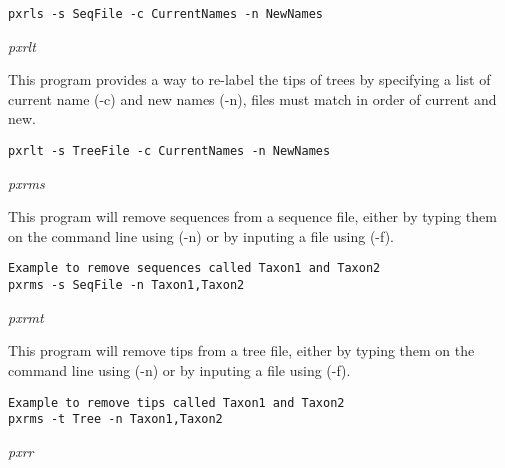 \documentclass[12pt,letterpaper]{article}
\renewcommand{\subsection}[1]{%
\bigskip
\begin{center}
\begin{large}
\normalfont\itshape #1
\end{large}
\end{center}}
\begin{document}
\begin{flushleft}
\begin{verbatim}
pxrls -s SeqFile -c CurrentNames -n NewNames
\end{verbatim}
\end{flushleft}


\subsection{pxrlt}

This program provides a way to re-label the tips of trees by specifying a list of current name (-c) and new names (-n), files must match in order of current and new.

\begin{flushleft}
\begin{verbatim}
pxrlt -s TreeFile -c CurrentNames -n NewNames
\end{verbatim}
\end{flushleft}

\subsection{pxrms}

This program will remove sequences from a sequence file, either by typing them on the command line using (-n) or by inputing a file using (-f).

\begin{flushleft}
\begin{verbatim}
Example to remove sequences called Taxon1 and Taxon2
pxrms -s SeqFile -n Taxon1,Taxon2
\end{verbatim}
\end{flushleft}

\subsection{pxrmt}

This program will remove tips from a tree file, either by typing them on the command line using (-n) or by inputing a file using (-f).

\begin{flushleft}
\begin{verbatim}
Example to remove tips called Taxon1 and Taxon2
pxrms -t Tree -n Taxon1,Taxon2
\end{verbatim}
\end{flushleft}

\subsection{pxrr}
\end{document}

